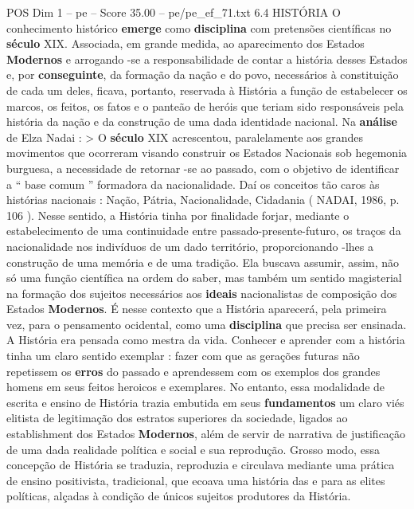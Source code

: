 \begin{textsample}{POS Dim 1 – pe – Score 35.00 – pe/pe\_ef\_71.txt}  \label{ex:f1_pos_250}
6.4 HISTÓRIA O conhecimento histórico \textbf{emerge} como \textbf{disciplina} com pretensões científicas no \textbf{século} XIX.
Associada, em grande medida, ao aparecimento dos Estados \textbf{Modernos} e arrogando -se a responsabilidade de contar a história desses Estados e, por \textbf{conseguinte}, da formação da nação e do povo, necessários à constituição de cada um deles, ficava, portanto, reservada à História a função de estabelecer os marcos, os feitos, os fatos e o panteão de heróis que teriam sido responsáveis pela história da nação e da construção de uma dada identidade nacional.
Na \textbf{análise} de Elza Nadai : > O \textbf{século} XIX acrescentou, paralelamente aos grandes movimentos que ocorreram visando construir os Estados Nacionais sob hegemonia burguesa, a necessidade de retornar -se ao passado, com o objetivo de identificar a “ base comum ” formadora da nacionalidade.
Daí os conceitos tão caros às histórias nacionais : Nação, Pátria, Nacionalidade, Cidadania ( NADAI, 1986, p. 106 ).
Nesse sentido, a História tinha por finalidade forjar, mediante o estabelecimento de uma continuidade entre passado-presente-futuro, os traços da nacionalidade nos indivíduos de um dado território, proporcionando -lhes a construção de uma memória e de uma tradição.
Ela buscava assumir, assim, não só uma função científica na ordem do saber, mas também um sentido magisterial na formação dos sujeitos necessários aos \textbf{ideais} nacionalistas de composição dos Estados \textbf{Modernos}.
É nesse contexto que a História aparecerá, pela primeira vez, para o pensamento ocidental, como uma \textbf{disciplina} que precisa ser ensinada.
A História era pensada como mestra da vida.
Conhecer e aprender com a história tinha um claro sentido exemplar : fazer com que as gerações futuras não repetissem os \textbf{erros} do passado e aprendessem com os exemplos dos grandes homens em seus feitos heroicos e exemplares.
No entanto, essa modalidade de escrita e ensino de História trazia embutida em seus \textbf{fundamentos} um claro viés elitista de legitimação dos estratos superiores da sociedade, ligados ao establishment dos Estados \textbf{Modernos}, além de servir de narrativa de justificação de uma dada realidade política e social e sua reprodução.
Grosso modo, essa concepção de História se traduzia, reproduzia e circulava mediante uma prática de ensino positivista, tradicional, que ecoava uma história das e para as elites políticas, alçadas à condição de únicos sujeitos produtores da História.

\end{textsample}
